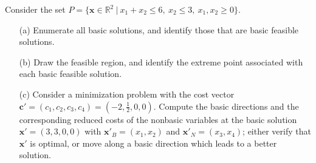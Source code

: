 
Consider the set $P=\{\mathbf{x}\in\mathbb{R}^2 ~|~ x_1 + x_2 \leq 6,~ x_2 \leq 3,~ x_1, x_2 \geq0\}$. 

\begin{itemize}
\item[(a)] Enumerate all basic solutions, and identify those that are basic feasible solutions.
\item[(b)] Draw the feasible region, and identify the extreme point associated with each basic feasible solution.
\item[(c)] Consider a minimization problem with the cost vector $\mathbf{c'}=(c_1,c_2,c_3,c_4)=(-2,\frac{1}{2},0,0)$. Compute the basic directions and the corresponding reduced costs of the nonbasic variables at the basic solution $\mathbf{x'}=(3,3,0,0)$ with $\mathbf{x}'_B=(x_1,x_2)$ and $\mathbf{x}'_N=(x_3,x_4)$; either verify that $\mathbf{x'}$ is optimal, or move along a basic direction which leads to a better solution. 
\end{itemize}